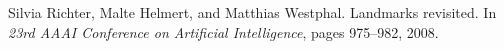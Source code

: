 \begin{thebibliography}{10}
\footnotesize

Silvia Richter, Malte Helmert, and Matthias Westphal.
\newblock Landmarks revisited.
\newblock In {\em 23rd AAAI Conference on Artificial Intelligence}, pages
975--982, 2008.
\end{thebibliography}

